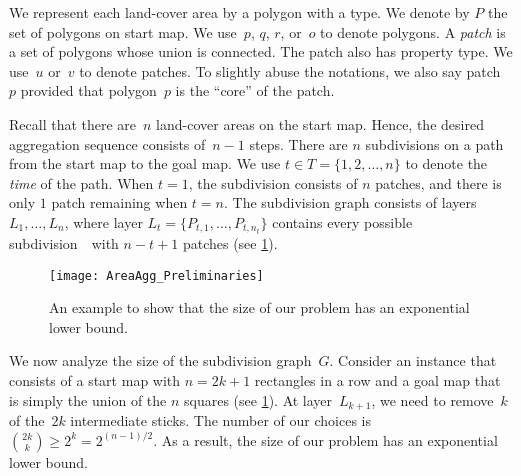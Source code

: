 We represent each land-cover area by a polygon with a type.
We denote by $P$ the set of polygons on start map.
We use~$p$, $q$, $r$, or~$o$ to denote polygons.
A \emph{patch} is a set of polygons whose union is connected. 
The patch also has property type.
We use~$u$ or~$v$ to denote patches.
To slightly abuse the notations, we also say patch~$p$
provided that polygon~$p$ is the ``core'' of the patch.


Recall that there are~$n$ land-cover areas on the start	map. 
Hence, the desired aggregation sequence consists of~$n-1$ steps. 
There are $n$ subdivisions on a path 
from the start map to the goal map. 
We use $t \in {T}=\{1,2,\dots,n\}$ to denote 
the \emph{time} of the path. 
When $t=1$, the subdivision consists of $n$ patches, 
and there is only $1$ patch remaining when $t=n$.
The subdivision graph consists of layers~${L}_1,\dots,{L}_n$, 
where layer ${L}_t=\{{P}_{t,1},\dots,{P}_{t,n_t}\}$
contains every possible subdivision~\Pnode\ with 
$n-t+1$ patches (see \fig\ref{fig:AreaAgg_ExponentialSize}).

\begin{figure}[tb]
	\centering
	\texttt{[image: AreaAgg\_Preliminaries]}
	\caption{An example to show that the size of our problem 
	has an exponential lower bound.}
	\label{fig:AreaAgg_ExponentialSize}
\end{figure}

We now analyze the size of the subdivision graph~$G$.
%
%
Consider an instance that consists of 
a start map with $n=2k+1$ rectangles in a row and
a goal map that is simply the union of the $n$ squares
(see \fig\ref{fig:AreaAgg_ExponentialSize}).
At layer~$L_{k+1}$, we need to remove~$k$ of the~$2k$ intermediate sticks. 
The number of our choices is ${{2k}\choose{k}} \ge 2^k = 2^{(n-1)/2}$.
As a result, the size of our problem has an exponential lower bound.


